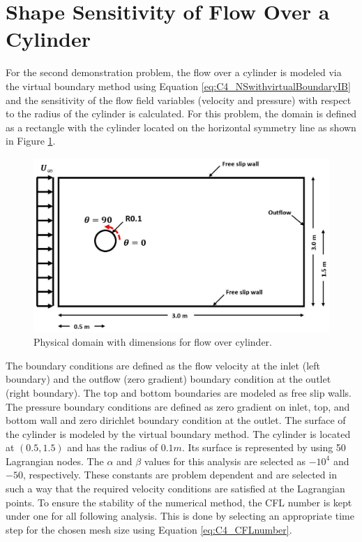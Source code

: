 \section{Shape Sensitivity of Flow Over a Cylinder}
For the second demonstration problem, the flow over a cylinder is modeled via the virtual boundary method using Equation \eqref{eq:C4_NSwithvirtualBoundaryIB} and the sensitivity of the flow field variables (velocity and pressure) with respect to the radius of the cylinder is calculated. For this problem, the domain is defined as a rectangle with the cylinder located on the horizontal symmetry line as shown in Figure \ref{fig:C4_cylinderPhysicalDomain}.
%
\begin{figure}[H]
    \centering
    \includegraphics[width=12.00cm]{Chapter_4/figure/flow_over_cylinder/flow_over_cylinder.png}
    \caption{Physical domain with dimensions for flow over cylinder.}
    \label{fig:C4_cylinderPhysicalDomain}
\end{figure}
%
The boundary conditions are defined as the flow velocity at the inlet (left boundary) and the outflow (zero gradient) boundary condition at the outlet (right boundary). The top and bottom boundaries are modeled as free slip walls. The pressure boundary conditions are defined as zero gradient on inlet, top, and bottom wall and zero dirichlet boundary condition at the outlet. The surface of the cylinder is modeled by the virtual boundary method. The cylinder is located at $(0.5, 1.5)$ and has the radius of $0.1 m$. Its surface is represented by using 50 Lagrangian nodes. The $\alpha$ and $\beta$ values for this analysis are selected as $-10^4$ and $-50$, respectively. These constants are problem dependent and are selected in such a way that the required velocity conditions are satisfied at the Lagrangian points. To ensure the stability of the numerical method, the CFL number is kept under one for all following analysis. This is done by selecting an appropriate time step for the chosen mesh size using Equation \eqref{eq:C4_CFLnumber}.
